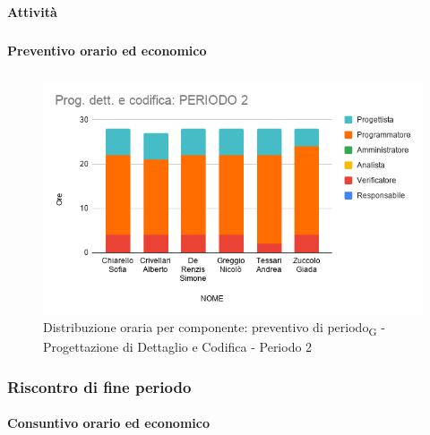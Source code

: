 
\paragraph{Attività}
\subparagraph*{}

\planningTable{
	
}



\paragraph{Preventivo orario ed economico}
\subparagraph*{}

\contabilitaTable{
	
}

\begin{figure}[H]
	\centering
	\includegraphics[scale=0.6]{res/images/charts/preventivo/prog_dett_2.png}
	\caption{Distribuzione oraria per componente: preventivo di periodo\textsubscript{G} - Progettazione di Dettaglio e Codifica - Periodo 2}
\end{figure}



\subsubsection{Riscontro di fine periodo}


\paragraph{Consuntivo orario ed economico}
\subparagraph*{}

